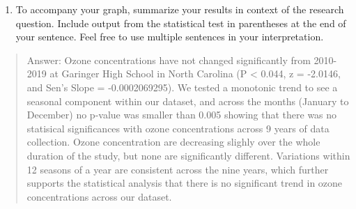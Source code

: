 \documentclass[]{article}
\providecommand{\tightlist}{%
  \setlength{\itemsep}{0pt}\setlength{\parskip}{0pt}}
\begin{document}
\begin{enumerate}
\def\labelenumi{\arabic{enumi}.}
\setcounter{enumi}{13}
\tightlist
\item
  To accompany your graph, summarize your results in context of the
  research question. Include output from the statistical test in
  parentheses at the end of your sentence. Feel free to use multiple
  sentences in your interpretation.
\end{enumerate}

\begin{quote}
Answer: Ozone concentrations have not changed significantly from
2010-2019 at Garinger High School in North Carolina (P \textless{}
0.044, z = -2.0146, and Sen's Slope = -0.0002069295). We tested a
monotonic trend to see a seasonal component within our dataset, and
across the months (January to December) no p-value was smaller than
0.005 showing that there was no statisical significances with ozone
concentrations across 9 years of data collection. Ozone concentration
are decreasing slighly over the whole duration of the study, but none
are significantly different. Variations within 12 seasons of a year are
consistent across the nine years, which further supports the statistical
analysis that there is no significant trend in ozone concentrations
across our dataset.
\end{quote}
\end{document}
